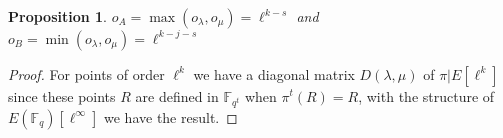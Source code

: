 \documentclass{lms}
\newcommand{\todo}[1]{{\color{red}TODO: #1}}
\newtheorem{prop}[thm]{Proposition}
\begin{document}
\begin{prop}
$o_A=\max(o_{\lambda},o_{\mu}) = \ell^{k-s}$ and $o_B=\min(o_{\lambda},o_{\mu}) = \ell^{k-j-s}$
\end{prop}

\begin{proof}

For points of order $\ell^k$ we have a diagonal matrix $D(\lambda, \mu)$ of $\pi|E[\ell^k]$ since these points $R$ are defined in $\mathbb{F}_{q^t}$ when $\pi^t(R)=R$,  with the structure of $E(\mathbb{F}_q)[\ell^{\infty}]$ we have the result.
\end{proof}
\end{document}
